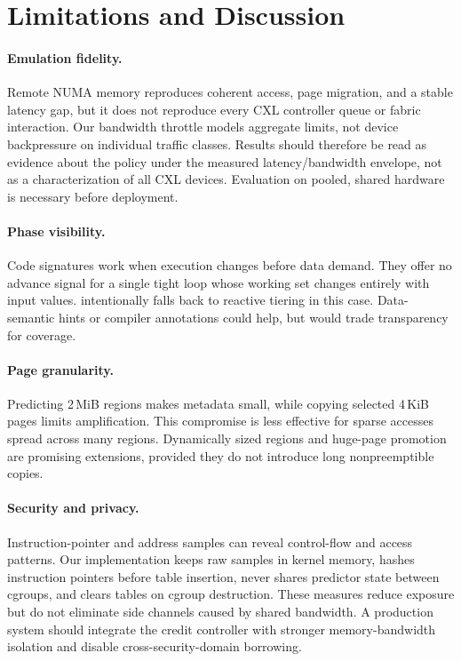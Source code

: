 \section{Limitations and Discussion}
\label{sec:limits}

\paragraph{Emulation fidelity.}
Remote NUMA memory reproduces coherent access, page migration, and a stable
latency gap, but it does not reproduce every CXL controller queue or fabric
interaction.  Our bandwidth throttle models aggregate limits, not device
backpressure on individual traffic classes.  Results should therefore be read
as evidence about the policy under the measured latency/bandwidth envelope,
not as a characterization of all CXL devices.  Evaluation on pooled, shared
hardware is necessary before deployment.

\paragraph{Phase visibility.}
Code signatures work when execution changes before data demand.  They offer no
advance signal for a single tight loop whose working set changes entirely with
input values.  \system intentionally falls back to reactive tiering in this
case.  Data-semantic hints or compiler annotations could help, but would trade
transparency for coverage.

\paragraph{Page granularity.}
Predicting 2\,MiB regions makes metadata small, while copying selected 4\,KiB
pages limits amplification.  This compromise is less effective for sparse
accesses spread across many regions.  Dynamically sized regions and huge-page
promotion are promising extensions, provided they do not introduce long
nonpreemptible copies.

\paragraph{Security and privacy.}
Instruction-pointer and address samples can reveal control-flow and access
patterns.  Our implementation keeps raw samples in kernel memory, hashes
instruction pointers before table insertion, never shares predictor state
between cgroups, and clears tables on cgroup destruction.  These measures
reduce exposure but do not eliminate side channels caused by shared bandwidth.
A production system should integrate the credit controller with stronger
memory-bandwidth isolation and disable cross-security-domain borrowing.

